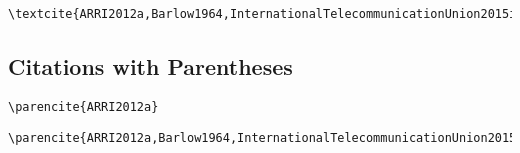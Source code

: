 \begin{lstlisting}[caption={Citation for Multiple Authors.}]
\textcite{ARRI2012a,Barlow1964,InternationalTelecommunicationUnion2015i,Long2014}
\end{lstlisting}

\textcite{ARRI2012a,Barlow1964,InternationalTelecommunicationUnion2015i,Long2014}

\subsection*{Citations with Parentheses}%
\label{subsec:citations-with-parentheses}

\begin{lstlisting}[caption={Citation with Parentheses for Single Author.}]
\parencite{ARRI2012a}
\end{lstlisting}

\parencite{ARRI2012a}

\begin{lstlisting}[caption={Citation with Parentheses for Multiple Authors.}s]
\parencite{ARRI2012a,Barlow1964,InternationalTelecommunicationUnion2015i,Long2014}
\end{lstlisting}

\parencite{ARRI2012a,Barlow1964,InternationalTelecommunicationUnion2015i,Long2014}
